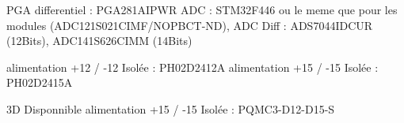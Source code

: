 PGA differentiel : PGA281AIPWR
ADC : STM32F446 ou le meme que pour les modules (ADC121S021CIMF/NOPBCT-ND), 
ADC Diff : ADS7044IDCUR (12Bits), ADC141S626CIMM (14Bits)

alimentation +12 / -12 Isolée : PH02D2412A
alimentation +15 / -15 Isolée : PH02D2415A

3D Disponnible
alimentation +15 / -15 Isolée : PQMC3-D12-D15-S

